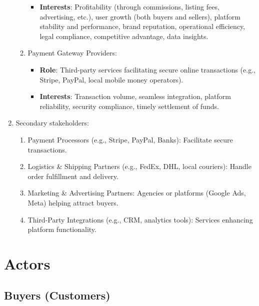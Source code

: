 \documentclass[a4paper,10pt]{article}
\begin{document}
\begin{enumerate}
\begin{enumerate}
\begin{itemize}
                        \item \textbf{Interests}: Profitability (through commissions, listing fees, advertising, etc.), user growth (both buyers and sellers), platform stability and performance, brand reputation, operational efficiency, legal compliance, competitive advantage, data insights.
                    \end{itemize}
              \item Payment Gateway Providers:
                    \begin{itemize}
                        \item \textbf{Role}: Third-party services facilitating secure online transactions (e.g., Stripe, PayPal, local mobile money operators).
                        \item \textbf{Interests}: Transaction volume, seamless integration, platform reliability, security compliance, timely settlement of funds.
                    \end{itemize}
          \end{enumerate}
    \item Secondary stakeholders:
          \begin{enumerate}
              \item Payment Processors (e.g., Stripe, PayPal, Banks): Facilitate secure transactions.

              \item Logistics \& Shipping Partners (e.g., FedEx, DHL, local couriers): Handle order fulfillment and delivery.

              \item Marketing \& Advertising Partners: Agencies or platforms (Google Ads, Meta) helping attract buyers.

              \item Third-Party Integrations (e.g., CRM, analytics tools): Services enhancing platform functionality.
          \end{enumerate}
\end{enumerate}

\section{Actors}

\subsection{Buyers (Customers)}
\end{document}
